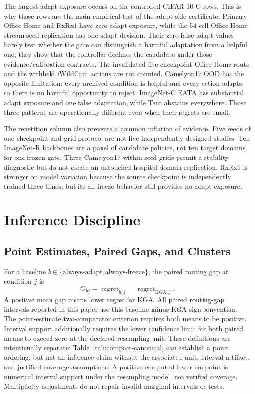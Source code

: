 The largest adapt exposure occurs on the controlled CIFAR-10-C rows. This is why those rows are the
main empirical test of the adapt-side certificate. Primary Office-Home and RxRx1 have zero adapt
exposure, while the 54-cell Office-Home stream-seed replication has one adapt decision. Their zero
false-adapt values barely test whether the gate can distinguish a harmful adaptation from a helpful
one; they show that the controller declines the candidate under those evidence/calibration
contracts. The invalidated five-checkpoint Office-Home route and the withheld iWildCam actions are
not counted. Camelyon17 OOD has the opposite limitation: every archived condition is helpful and
every action adapts, so there is no harmful opportunity to reject. ImageNet-C EATA has substantial
adapt exposure and one false adaptation, while Tent
abstains everywhere. Those three patterns are operationally different even when their regrets are
small.

The repetition column also prevents a common inflation of evidence. Five seeds of one checkpoint
and grid protocol are not five independently designed studies. Ten ImageNet-R backbones are a panel
of candidate policies, not ten target domains for one frozen gate. Three Camelyon17 within-seed
grids permit a stability diagnostic but do not create an untouched hospital-domain replication.
RxRx1 is stronger on model variation because the source checkpoint is independently trained three
times, but its all-freeze behavior still provides no adapt exposure.

\section{Inference Discipline}
\label{app:compact-inference}

\subsection{Point Estimates, Paired Gaps, and Clusters}

For a baseline $b\in\{\text{always-adapt},\text{always-freeze}\}$, the paired routing gap at
condition $j$ is
\[
G_{bj}=\operatorname{regret}_{b,j}-\operatorname{regret}_{\mathrm{KGA},j}.
\]
A positive mean gap means lower regret for KGA. All paired routing-gap intervals reported in this
paper use this baseline-minus-KGA sign convention. The point-estimate two-comparator criterion requires both
means to be positive. Interval support additionally requires the lower confidence limit for both
paired means to exceed zero at the declared resampling unit. These definitions are intentionally separate:
Table~\ref{tab:compact-canonical} can establish a point ordering, but not an inference claim without
the associated unit, interval artifact, and justified coverage assumptions. A positive computed
lower endpoint is numerical interval support under the resampling model, not verified coverage.
Multiplicity adjustments do not repair invalid marginal intervals or tests.


